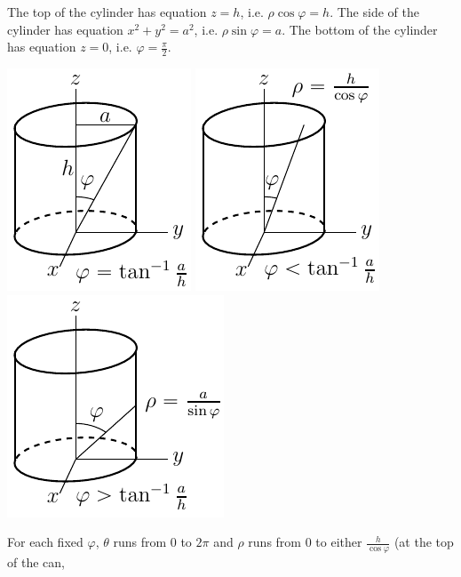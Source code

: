 \begin{solution}
The top of the cylinder has equation $z=h$, i.e. $\rho\cos\varphi=h$.
The side of the cylinder has equation $x^2+y^2=a^2$, i.e. $\rho\sin\varphi=a$.
The bottom of the cylinder has equation $z=0$, i.e. $\varphi=\frac{\pi}{2}$.
\begin{center}
     \includegraphics{fig/cylinder1.pdf}\qquad
     \includegraphics{fig/cylinder2.pdf}\qquad
     \includegraphics{fig/cylinder3.pdf}
\end{center}
For each fixed $\varphi$, $\theta$ runs from $0$ to $2\pi$ and $\rho$ 
runs from $0$
to either $\frac{h}{\cos\varphi}$ (at the top of the can,

\end{solution}
